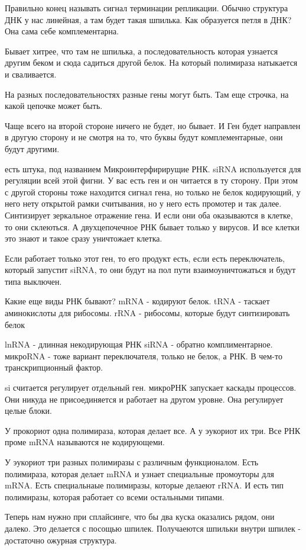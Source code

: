 Правильно конец называть сигнал терминации репликации. Обычно
структура ДНК у нас линейная, а там будет
такая шпилька. Как образуется петля в ДНК? Она
сама себе комплементарна.

Бывает хитрее, что там не шпилька, а последовательность которая
узнается другим беком и сюда садиться другой белок.
На который полимираза натыкается и сваливается.

На разных последовательностях разные гены могут быть. Там еще строчка,
на какой цепочке может быть.

Чаще всего на второй стороне ничего не будет, но бывает. И Ген будет
направлен в другую сторону и не смотря на то, что буквы будут
комплементарные, они будут другими.

есть штука, под названием Микроинтерфирирущие РНК.
siRNA используется для регуляции всей этой фигни. У вас есть
ген и он читается в ту сторону. При этом с другой стороны тоже
находится сигнал гена, но только не белок кодирующий, у него нету
открытой рамки считывания, но у него есть промотер и так далее.
Синтизирует зеркальное отражение гена. И если
они оба оказываются в клетке, то они склеються. А двухцепочечное
РНК бывает только у вирусов. И все клетки это знают и такое
сразу уничтожает клетка.

Если работает только этот ген, то его продукт есть, если
есть переключатель, который запустит siRNA, то они будут на пол пути
взаимоуничтожаться и будут типа выключен.

Какие еще виды РНК бывают?
mRNA - кодируют белок. 
tRNA - таскает аминокислоты для рибосомы. 
rRNA - рибосомы, которые будут синтизировать белок

lnRNA - длинная некодирующая РНК
siRNA - обратно комплиментарное. 
микроRNA  - тоже вариант переключателя, только не белок, а РНК. В чем-то транскрипционный фактор. 

si считается регулирует отдельный ген. 
микроРНК запускает каскады процессов. Они никуда не присоединяется и работает на другом 
уровне. Она регулирует целые блоки. 

У прокориот одна полимираза, которая делает все. А у эукориот их три. Все РНК проме mRNA
называются не кодирующеми. 

У эукориот три разных полимиразы с различным 
функционалом. Есть полимираза, которая делает mRNA и узнает 
специальные промоуторы для mRNA. Есть специальнаые полимиразы, 
которые делаеют rRNA. И есть тип полимиразы, которая работает со всеми остальными типами. 


Теперь нам нужно при сплайсинге, что бы два куска оказались рядом, они далеко. Это 
делается с посощью шпилек. Получаеются шпильки внутри шпилек - достаточно ожурная структура. 

 



